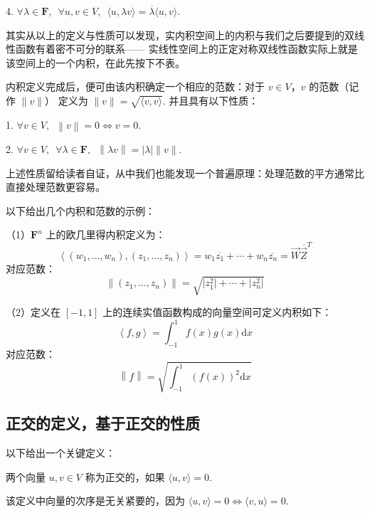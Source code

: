 4. $\forall \lambda \in \mathbf{F}, \enspace \forall u, v \in V, \enspace \langle u, \lambda v \rangle = \overline{\lambda} \langle u, v \rangle$.

其实从以上的定义与性质可以发现，实内积空间上的内积与我们之后要提到的双线性函数有着密不可分的联系——
实线性空间上的正定对称双线性函数实际上就是该空间上的一个内积，在此先按下不表。

\vspace{2ex} 

内积定义完成后，便可由该内积确定一个相应的范数：对于 $v \in V$，$v$ 的范数（记作 $ \lVert v \rVert $）
定义为 $ \lVert v \rVert = \sqrt{\langle v, v \rangle}$. \enspace 并且具有以下性质：

1. $\forall v \in V, \enspace \left\lVert v \right\rVert = 0 \Leftrightarrow v = 0$.

2. $\forall v \in V, \enspace \forall \lambda \in \mathbf{F}, 
\enspace \left\lVert \lambda v \right\rVert  = \left\lvert \lambda \right\rvert \lVert v \rVert$.

上述性质留给读者自证，从中我们也能发现一个普遍原理：处理范数的平方通常比直接处理范数更容易。

\vspace{2ex} 

以下给出几个内积和范数的示例：
\begin{example}
    \textup{（1）}$\mathbf{F}^{n}$ 上的欧几里得内积定义为：
    \[\left\langle (w_1, \ldots, w_n), (z_1, \ldots, z_n)\right\rangle = w_1\overline{z_1} + \cdots + w_n\overline{z_n} = \vec{W}\overline{\vec{Z}}^{T}\]
    对应范数：
    \[\left\lVert (z_1, \ldots, z_n) \right\rVert  = \sqrt{\lvert z^2_1 \rvert + \cdots + \lvert z^2_n \rvert}\]

    \textup{（2）}定义在 $ \left[-1, 1\right] $ 上的连续实值函数构成的向量空间可定义内积如下：
    \[\left\langle f, g\right\rangle = \int_{-1}^1f(x)g(x)\mathrm{d}x\]
    对应范数：
    \[\left\lVert f \right\rVert = \sqrt{\int_{-1}^1(f(x))^2\mathrm{d}x}\]
\end{example}

\subsection{正交的定义，基于正交的性质}

以下给出一个关键定义：
\begin{definition}
    两个向量 $u, v \in V$ 称为正交的，如果 $\langle u, v\rangle = 0$.
\end{definition}
该定义中向量的次序是无关紧要的，因为 $\langle u, v\rangle = 0 \Leftrightarrow \langle v, u\rangle = 0$. 

